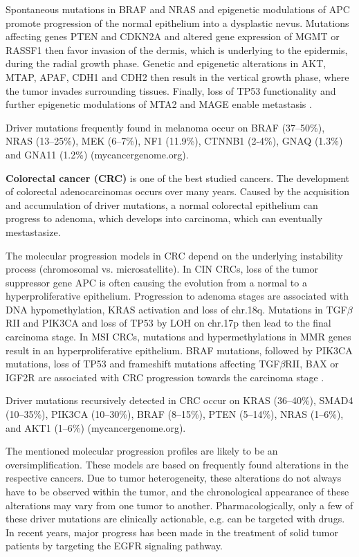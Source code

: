 {{{    Spontaneous mutations in BRAF and NRAS and epigenetic modulations of APC
    promote progression of the normal epithelium into a dysplastic
    nevus. Mutations affecting genes PTEN and CDKN2A and altered gene
    expression of MGMT or RASSF1 then favor invasion of the dermis, which is
    underlying to the epidermis, during the radial growth phase. Genetic and
    epigenetic alterations in AKT, MTAP, APAF, CDH1 and CDH2 then result in
    the vertical growth phase, where the tumor invades surrounding tissues.
    Finally, loss of TP53 functionality and further epigenetic modulations of
    MTA2 and MAGE enable metastasis {\cite{melanoma}} {\cite{melanoma_2}}.

    Driver mutations frequently found in melanoma
    occur on BRAF (37--50\%), NRAS (13--25\%), MEK (6--7\%), NF1 (11.9\%),
    CTNNB1 (2-4\%), GNAQ (1.3\%) and GNA11 (1.2\%) (mycancergenome.org).

    \textbf{Colorectal cancer (CRC)} is one of the best studied cancers. The
    development of colorectal adenocarcinomas occurs over many years. Caused
    by the acquisition and accumulation of driver mutations, a normal
    colorectal epithelium can progress to adenoma, which develops into
    carcinoma, which can eventually mestastasize.

    The molecular progression models in CRC depend on the underlying instability
    process (chromosomal vs. microsatellite). In CIN CRCs, loss of the tumor
    suppressor gene APC is often causing the evolution from a normal to a
    hyperproliferative epithelium. Progression to adenoma stages are associated
    with DNA hypomethylation, KRAS activation and loss of chr.18q. Mutations in
    TGF$\beta$RII and PIK3CA and loss of TP53 by LOH on chr.17p then lead to the
    final carcinoma stage. In MSI CRCs, mutations and hypermethylations in MMR
    genes result in an hyperproliferative epithelium. BRAF mutations, followed
    by PIK3CA mutations, loss of TP53 and frameshift mutations affecting
    TGF$\beta$RII, BAX or IGF2R are associated with CRC progression towards the
    carcinoma stage {\cite{cin_crc}} {\cite{crc}} {\cite{crc_2}}.

    Driver mutations recursively
    detected in CRC occur on KRAS (36--40\%), SMAD4 (10--35\%), PIK3CA
    (10--30\%), BRAF (8--15\%), PTEN (5--14\%), NRAS (1--6\%), and  AKT1
    (1--6\%) (mycancergenome.org).

    The mentioned molecular progression profiles are likely to be an
    oversimplification. These models are based on frequently found alterations
    in the respective cancers. Due to tumor heterogeneity, these alterations
    do not always have to be observed within the tumor, and the chronological
    appearance of these alterations may vary from one tumor to another.
    Pharmacologically, only a few of these driver mutations are clinically
    actionable, e.g. can be targeted with drugs. In recent years, major progress
    has been made in the treatment of solid tumor patients by targeting the
    EGFR signaling pathway.

}}}
